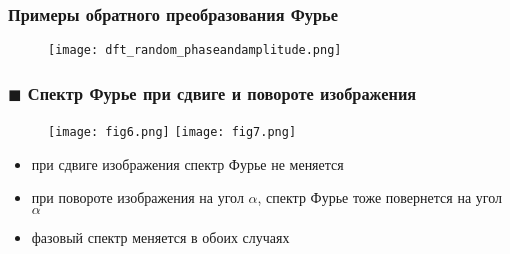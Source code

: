 \documentclass[
    12pt, 
    usepdftitle=false,
    aspectratio=1610
]{beamer}
\begin{document}
\begin{frame}
    \frametitle{Примеры обратного преобразования Фурье}
    \begin{figure}
        \centering
        \texttt{[image: dft\_random\_phaseandamplitude.png]}
    \end{figure}
\end{frame}

\begin{frame}
\frametitle{$\blacksquare$ Спектр Фурье при сдвиге и повороте изображения}
\begin{figure}
    \centering
    \texttt{[image: fig6.png]}
    \texttt{[image: fig7.png]}
\end{figure}
\begin{itemize}
    \item при сдвиге изображения спектр Фурье не меняется
    \item при повороте изображения на угол $\alpha$, спектр Фурье тоже повернется на угол $\alpha$
    \item фазовый спектр меняется в обоих случаях
\end{itemize}
\end{frame}

\end{document}

